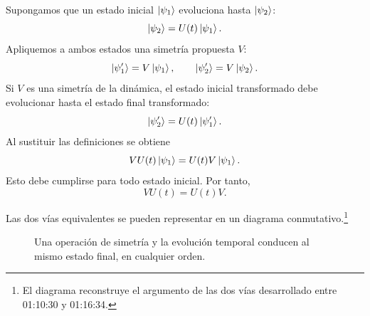 Supongamos que un estado inicial \(\left\lvert\psi_1\right\rangle\) evoluciona hasta \(\left\lvert\psi_2\right\rangle\):
\begin{equation}
\left\lvert\psi_2\right\rangle=U(t)\left\lvert\psi_1\right\rangle.
\end{equation}
Apliquemos a ambos estados una simetría propuesta \(V\):
\begin{equation}
\left\lvert\psi_1'\right\rangle=V\left\lvert\psi_1\right\rangle,
\qquad
\left\lvert\psi_2'\right\rangle=V\left\lvert\psi_2\right\rangle.
\end{equation}
Si \(V\) es una simetría de la dinámica, el estado inicial transformado debe evolucionar hasta el estado final transformado:
\begin{equation}
\left\lvert\psi_2'\right\rangle=U(t)\left\lvert\psi_1'\right\rangle.
\end{equation}
Al sustituir las definiciones se obtiene
\begin{equation}
VU(t)\left\lvert\psi_1\right\rangle
=
U(t)V\left\lvert\psi_1\right\rangle.
\end{equation}
Esto debe cumplirse para todo estado inicial. Por tanto,
\begin{equation}
VU(t)=U(t)V.
\end{equation}

Las dos vías equivalentes se pueden representar en un diagrama conmutativo.\footnote{El diagrama reconstruye el argumento de las dos vías desarrollado entre 01:10:30 y 01:16:34.}
\begin{figure}
\centering
{}
\caption{Una operación de simetría y la evolución temporal conducen al mismo estado final, en cualquier orden.}
\end{figure}

\begin{classroomqa}
\end{classroomqa}

\begin{classroomqa}
\end{classroomqa}

